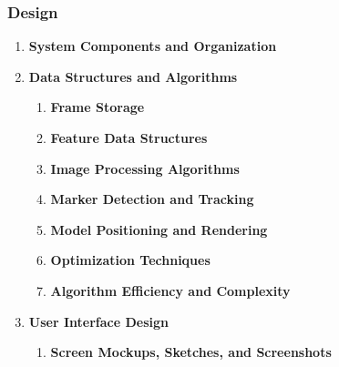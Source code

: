 \documentclass[12pt]{article}
\begin{document}
\subsubsection{Design}
\begin{enumerate}
    \item \textbf{System Components and Organization}

    \item \textbf{Data Structures and Algorithms}
          \begin{enumerate}
              \item \textbf{Frame Storage}

              \item \textbf{Feature Data Structures}

              \item \textbf{Image Processing Algorithms}

              \item \textbf{Marker Detection and Tracking}

              \item \textbf{Model Positioning and Rendering}

              \item \textbf{Optimization Techniques}

              \item \textbf{Algorithm Efficiency and Complexity}
          \end{enumerate}


    \item \textbf{User Interface Design}
          \begin{enumerate}
              \item \textbf{Screen Mockups, Sketches, and Screenshots}


\end{enumerate}
\end{enumerate}
\end{document}
